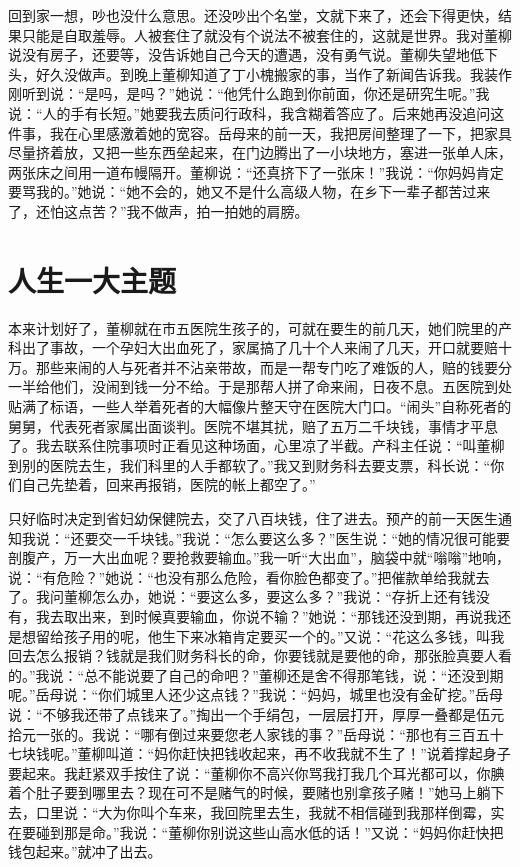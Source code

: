 \documentclass[12pt,oneside]{book}
\begin{document}
回到家一想，吵也没什么意思。还没吵出个名堂，文就下来了，还会下得更快，结果只能是自取羞辱。人被套住了就没有个说法不被套住的，这就是世界。我对董柳说没有房子，还要等，没告诉她自己今天的遭遇，没有勇气说。董柳失望地低下头，好久没做声。到晚上董柳知道了丁小槐搬家的事，当作了新闻告诉我。我装作刚听到说：``是吗，是吗？''她说：``他凭什么跑到你前面，你还是研究生呢。''我说：``人的手有长短。''她要我去质问行政科，我含糊着答应了。后来她再没追问这件事，我在心里感激着她的宽容。岳母来的前一天，我把房间整理了一下，把家具尽量挤着放，又把一些东西垒起来，在门边腾出了一小块地方，塞进一张单人床，两张床之间用一道布幔隔开。董柳说：``还真挤下了一张床！''我说：``你妈妈肯定要骂我的。''她说：``她不会的，她又不是什么高级人物，在乡下一辈子都苦过来了，还怕这点苦？''我不做声，拍一拍她的肩膀。


\chapter{人生一大主题}

本来计划好了，董柳就在市五医院生孩子的，可就在要生的前几天，她们院里的产科出了事故，一个孕妇大出血死了，家属搞了几十个人来闹了几天，开口就要赔十万。那些来闹的人与死者并不沾亲带故，而是一帮专门吃了难饭的人，赔的钱要分一半给他们，没闹到钱一分不给。于是那帮人拼了命来闹，日夜不息。五医院到处贴满了标语，一些人举着死者的大幅像片整天守在医院大门口。``闹头''自称死者的舅舅，代表死者家属出面谈判。医院不堪其扰，赔了五万二千块钱，事情才平息了。我去联系住院事项时正看见这种场面，心里凉了半截。产科主任说：``叫董柳到别的医院去生，我们科里的人手都软了。''我又到财务科去要支票，科长说：``你们自己先垫着，回来再报销，医院的帐上都空了。''

只好临时决定到省妇幼保健院去，交了八百块钱，住了进去。预产的前一天医生通知我说：``还要交一千块钱。''我说：``怎么要这么多？''医生说：``她的情况很可能要剖腹产，万一大出血呢？要抢救要输血。''我一听``大出血''，脑袋中就``嗡嗡''地响，说：``有危险？''她说：``也没有那么危险，看你脸色都变了。''把催款单给我就去了。我问董柳怎么办，她说：``要这么多，要这么多？''我说：``存折上还有钱没有，我去取出来，到时候真要输血，你说不输？''她说：``那钱还没到期，再说我还是想留给孩子用的呢，他生下来冰箱肯定要买一个的。''又说：``花这么多钱，叫我回去怎么报销？钱就是我们财务科长的命，你要钱就是要他的命，那张脸真要人看的。''我说：``总不能说要了自己的命吧？''董柳还是舍不得那笔钱，说：``还没到期呢。''岳母说：``你们城里人还少这点钱？''我说：``妈妈，城里也没有金矿挖。''岳母说：``不够我还带了点钱来了。''掏出一个手绢包，一层层打开，厚厚一叠都是伍元拾元一张的。我说：``哪有倒过来要您老人家钱的事？''岳母说：``那也有三百五十七块钱呢。''董柳叫道：``妈你赶快把钱收起来，再不收我就不生了！''说着撑起身子要起来。我赶紧双手按住了说：``董柳你不高兴你骂我打我几个耳光都可以，你腆着个肚子要到哪里去？现在可不是赌气的时候，要赌也别拿孩子赌！''她马上躺下去，口里说：``大为你叫个车来，我回院里去生，我就不相信碰到我那样倒霉，实在要碰到那是命。''我说：``董柳你别说这些山高水低的话！''又说：``妈妈你赶快把钱包起来。''就冲了出去。
\end{document}
